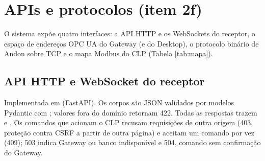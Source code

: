 \section{APIs e protocolos (item 2f)}

O sistema expõe quatro interfaces: a API HTTP e os WebSockets do receptor, o espaço de endereços OPC UA do Gateway (e do Desktop), o protocolo binário de Andon sobre TCP e o mapa Modbus do CLP (Tabela \ref{tab:mapa}).

\subsection{API HTTP e WebSocket do receptor}

Implementada em  (FastAPI). Os corpos são JSON validados por modelos Pydantic com ; valores fora do domínio retornam 422. Todas as respostas trazem  e . Os comandos que acionam o CLP recusam requisições de outra origem (403, proteção contra CSRF a partir de outra página) e aceitam um comando por vez (409); 503 indica Gateway ou banco indisponível e 504, comando sem confirmação do Gateway.

